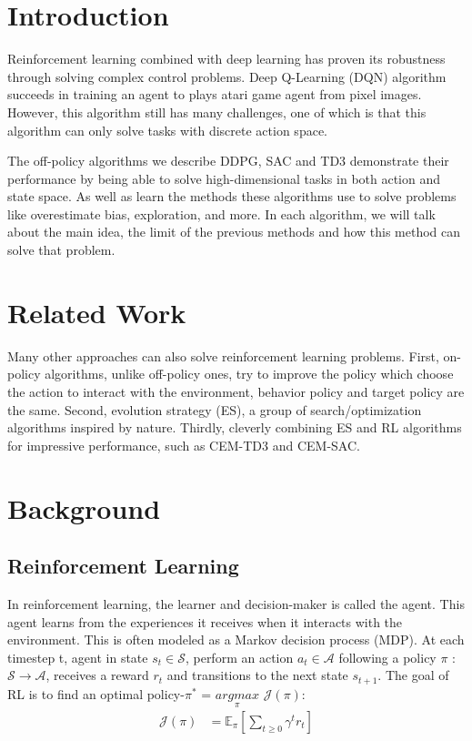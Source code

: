 \section{Introduction}
Reinforcement learning combined with deep learning has proven its robustness through solving complex control problems. Deep Q-Learning (DQN) algorithm succeeds in training an agent to plays atari game agent from pixel images. However, this algorithm still has many challenges, one of which is that this algorithm can only solve tasks with discrete action space.

The off-policy algorithms we describe DDPG, SAC and TD3 demonstrate their performance by being able to solve high-dimensional tasks in both action and state space. As well as learn the methods these algorithms use to solve problems like overestimate bias, exploration, and more. In each algorithm, we will talk about the main idea, the limit of the previous methods and how this method can solve that problem.

\section{Related Work}
Many other approaches can also solve reinforcement learning problems. First, on-policy algorithms, unlike off-policy ones, try to improve the policy which choose the action to interact with the environment, behavior policy and target policy are the same. Second, evolution strategy (ES), a group of search/optimization algorithms inspired by nature. Thirdly, cleverly combining ES and RL algorithms for impressive performance, such as CEM-TD3 and CEM-SAC.


\section{Background}
\subsection{Reinforcement Learning}
In reinforcement learning, the learner and decision-maker is called the agent. This agent learns from the experiences it receives when it interacts with the environment. This is often modeled as a Markov decision process (MDP). At each timestep t, agent in state $s_t \in \mathcal{S}$, perform an action $a_t \in \mathcal{A}$ following a policy $\pi$ : $\mathcal{S} \rightarrow \mathcal{A}$, receives a reward $r_t$ and transitions to the next state $s_{t+1}$. The goal of RL is to find an optimal policy-$\pi^{*}$ = $\underset{\pi}{argmax}$ $\mathcal{J}(\pi)$: 
\begin{align}
\mathcal{J}(\pi)
&= \mathbb{E}_{\pi}[ \sum_{t\geq0} \gamma^{t}r_t]
\end{align}

